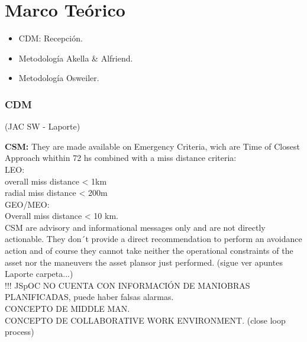 \chapter{Marco Teórico}
\label{chap:marcoteorico}

\begin{itemize}
 \item CDM: Recepci\'on.
 \item Metodolog\'ia Akella \& Alfriend.
 \item Metodolog\'ia Osweiler.
\end{itemize}

\subsection{CDM}
(JAC SW - Laporte)

{\bf{CSM:}} They are made available on Emergency Criteria, wich are Time of Closest Approach whithin 72 hs combined with a miss distance criteria:\\
LEO:\\
overall miss distance < 1km\\
radial miss distance < 200m\\
GEO/MEO:\\
Overall miss distance < 10 km.\\

CSM are advisory and informational messages only and are not directly actionable. They don´t provide a direct recommendation to perform an avoidance action and of course they cannot take neither the operational constraints of the asset nor the maneuvers the asset plansor just performed. (sigue ver apuntes Laporte carpeta...)\\

!!! JSpOC NO CUENTA CON INFORMACI\'ON DE MANIOBRAS PLANIFICADAS, puede haber falsas alarmas.\\

CONCEPTO DE MIDDLE MAN.\\
CONCEPTO DE COLLABORATIVE WORK ENVIRONMENT. (close loop process)